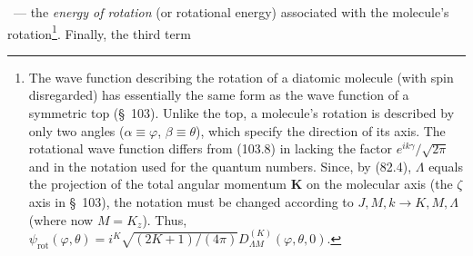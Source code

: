 ~--- the \emph{energy of rotation} (or rotational energy) associated with the molecule's rotation\footnote{The wave function describing the rotation of a diatomic molecule (with spin disregarded) has essentially the same form as the wave function of a symmetric top (\S~103). Unlike the top, a molecule's rotation is described by only two angles ($\alpha\equiv\varphi$, $\beta\equiv\theta$), which specify the direction of its axis. The rotational wave function differs from (103.8) in lacking the factor $e^{ik\gamma}/\sqrt{2\pi}$ and in the notation used for the quantum numbers. Since, by (82.4), $\Lambda$ equals the projection of the total angular momentum $\mathbf K$ on the molecular axis (the $\zeta$ axis in \S~103), the notation must be changed according to $J,M,k\to K,M,\Lambda$ (where now $M=K_z$). Thus, $\psi_{\mathrm{rot}}(\varphi,\theta)=i^K\sqrt{(2K+1)/(4\pi)}D_{\Lambda M}^{(K)}(\varphi,\theta,0)$.}. Finally, the third term
